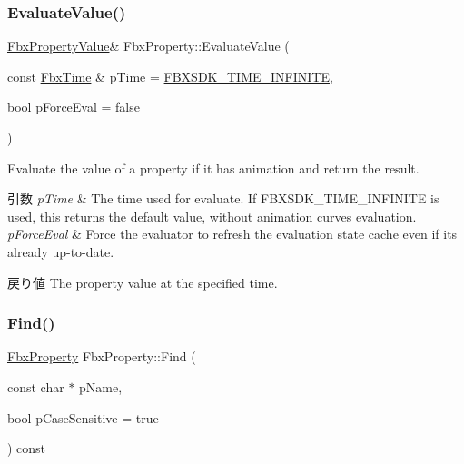 \subsubsection{\texorpdfstring{Evaluate\+Value()}{EvaluateValue()}\hspace{0.1cm}{\footnotesize\ttfamily [2/2]}}
{\footnotesize\ttfamily \hyperlink{class_fbx_property_value}{Fbx\+Property\+Value}\& Fbx\+Property\+::\+Evaluate\+Value (\begin{DoxyParamCaption}\item[{const \hyperlink{class_fbx_time}{Fbx\+Time} \&}]{p\+Time = {\ttfamily \hyperlink{fbxtime_8h_a1e6db3fe0f84f0b7daa775739f93526f}{F\+B\+X\+S\+D\+K\+\_\+\+T\+I\+M\+E\+\_\+\+I\+N\+F\+I\+N\+I\+TE}},  }\item[{bool}]{p\+Force\+Eval = {\ttfamily false} }\end{DoxyParamCaption})}

Evaluate the value of a property if it has animation and return the result. 
\begin{DoxyParams}{引数}
{\em p\+Time} & The time used for evaluate. If F\+B\+X\+S\+D\+K\+\_\+\+T\+I\+M\+E\+\_\+\+I\+N\+F\+I\+N\+I\+TE is used, this returns the default value, without animation curves evaluation. \\
\hline
{\em p\+Force\+Eval} & Force the evaluator to refresh the evaluation state cache even if its already up-\/to-\/date. \\
\hline
\end{DoxyParams}
\begin{DoxyReturn}{戻り値}
The property value at the specified time. 
\end{DoxyReturn}
\mbox{\label{class_fbx_property_af6dc98aa7ae9fd339f5b463845f56b29}} 
\subsubsection{\texorpdfstring{Find()}{Find()}\hspace{0.1cm}{\footnotesize\ttfamily [1/2]}}
{\footnotesize\ttfamily \hyperlink{class_fbx_property}{Fbx\+Property} Fbx\+Property\+::\+Find (\begin{DoxyParamCaption}\item[{const char $\ast$}]{p\+Name,  }\item[{bool}]{p\+Case\+Sensitive = {\ttfamily true} }\end{DoxyParamCaption}) const\hspace{0.3cm}{\ttfamily [inline]}}

